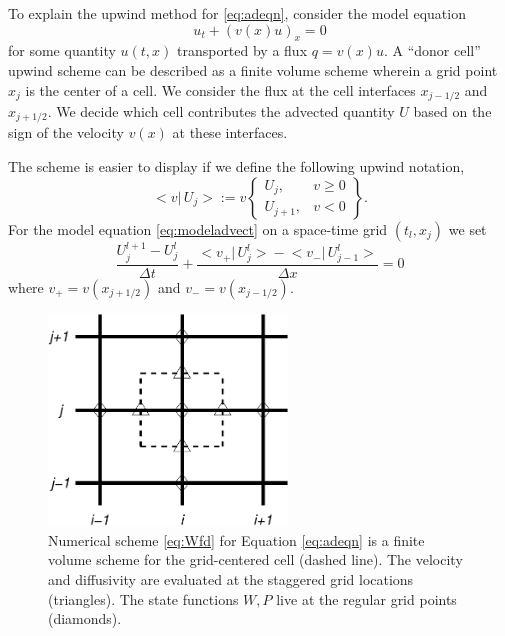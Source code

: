 \documentclass[11pt,final]{amsart}%
\begin{document}
To explain the upwind method for \eqref{eq:adeqn}, consider the model equation
\begin{equation} \label{eq:modeladvect}
u_t + (v(x) u)_x = 0
\end{equation}
for some quantity $u(t,x)$ transported by a flux $q = v(x) u$.  A ``donor cell'' upwind scheme can be described as a finite volume scheme \citep{LeVeque} wherein a grid point $x_j$ is the center of a cell.  We consider the flux at the cell interfaces $x_{j-1/2}$ and $x_{j+1/2}$.  We decide which cell contributes the advected quantity $U$ based on the sign of the velocity $v(x)$ at these interfaces.

The scheme is easier to display if we define the following upwind notation,
\newcommand{\up}[2]{\big<#1\big|\,#2\big>}
	$$\up{v}{U_j} := v \begin{Bmatrix} U_j, & v \ge 0 \\ U_{j+1}, & v < 0 \end{Bmatrix}.$$
For the model equation \eqref{eq:modeladvect} on a space-time grid $(t_l,x_j)$ we set
\begin{equation}\label{eq:modelfdadvect}
\frac{U_j^{l+1} - U_j^l}{\Delta t} + \frac{\up{v_+}{U_j^l} - \up{v_-}{U_{j-1}^l}}{\Delta x} = 0
\end{equation}
where $v_+ = v(x_{j+1/2})$ and $v_-=v(x_{j-1/2})$.

\begin{figure}[ht]
\centering
\includegraphics[width=2.5in,keepaspectratio=true]{figs/diffstencil}
\bigskip
\caption{Numerical scheme \eqref{eq:Wfd} for Equation \eqref{eq:adeqn} is a finite volume scheme for the grid-centered cell (dashed line).  The velocity and diffusivity are evaluated at the staggered grid locations (triangles).  The state functions $W,P$ live at the regular grid points (diamonds).}
\label{fig:stencil}
\end{figure}
\end{document}
